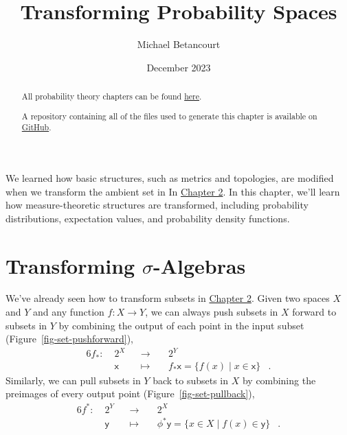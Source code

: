 \documentclass[
  letterpaper,
  DIV=11,
  numbers=noendperiod]{scrartcl}
\title{Transforming Probability Spaces}
\author{Michael Betancourt}
\date{December 2023}
\renewcommand*\contentsname{Table of contents}
\newcommand\contentsname{Table of contents}
\begin{document}
\maketitle
\begin{abstract}
All probability theory chapters can be found
\href{http://www.symplectomorphic.com/writing/\#part1}{here}.

A repository containing all of the files used to generate this chapter
is available on
\href{https://github.com/betanalpha/quarto_chapters/tree/main/7_transforming_probability_spaces}{GitHub}.
\end{abstract}

\renewcommand*\contentsname{Table of contents}
{
\hypersetup{linkcolor=}
\setcounter{tocdepth}{3}
\tableofcontents
}
We learned how basic structures, such as metrics and topologies, are
modified when we transform the ambient set in In
\href{http://www.symplectomorphic.com/assets/chapters_html/spaces.html}{Chapter
2}. In this chapter, we'll learn how measure-theoretic structures are
transformed, including probability distributions, expectation values,
and probability density functions.

\section{\texorpdfstring{Transforming
{\(\sigma\)}-Algebras}{Transforming \textbackslash sigma-Algebras}}\label{sec:pushforward-sets}

We've already seen how to transform subsets in
\href{http://www.symplectomorphic.com/assets/chapters_html/spaces.html}{Chapter
2}. Given two spaces \(X\) and \(Y\) and any function
\(f : X \rightarrow Y\), we can always push subsets in \(X\) forward to
subsets in \(Y\) by combining the output of each point in the input
subset (Figure~\ref{fig-set-pushforward}), \begin{alignat*}{6}
f_{*} :\; & 2^{X} & &\rightarrow& \; & 2^{Y} &
\\
& \mathsf{x} & &\mapsto& &
f_{*} \mathsf{x} = \{ f(x) \mid x \in \mathsf{x} \}  &.
\end{alignat*} Similarly, we can pull subsets in \(Y\) back to subsets
in \(X\) by combining the preimages of every output point
(Figure~\ref{fig-set-pullback}), \begin{alignat*}{6}
f^{*} :\; & 2^{Y} & &\rightarrow& \; & 2^{X} &
\\
& \mathsf{y} & &\mapsto& &
\phi^{*} \mathsf{y} = \{ x \in X \mid f(x) \in \mathsf{y} \}  &.
\end{alignat*}
\end{document}
